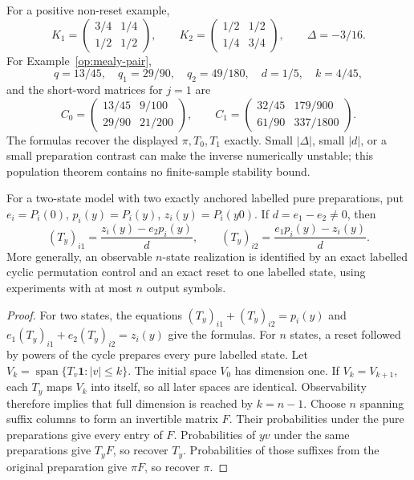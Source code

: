 For a positive non-reset example,
\[
 K_1=\begin{pmatrix}3/4&1/4\\1/2&1/2\end{pmatrix},\qquad
 K_2=\begin{pmatrix}1/2&1/2\\1/4&3/4\end{pmatrix},\qquad
 \Delta=-3/16.
\]
For Example~\ref{op:mealy-pair},
\[
 q=13/45,\quad q_1=29/90,\quad q_2=49/180,\quad
 d=1/5,\quad k=4/45,
\]
and the short-word matrices for \(j=1\) are
\[
 C_0=\begin{pmatrix}13/45&9/100\\29/90&21/200\end{pmatrix},
 \qquad
 C_1=\begin{pmatrix}32/45&179/900\\61/90&337/1800\end{pmatrix}.
\]
The formulas recover the displayed \(\pi,T_0,T_1\) exactly.
Small \(|\Delta|\), small \(|d|\), or a small preparation contrast can
make the inverse numerically unstable; this population theorem
contains no finite-sample stability bound.

\begin{proposition}
\label{op:anchored-preparations}
For a two-state model with two exactly anchored labelled pure
preparations, put
\(e_i=P_i(0)\), \(p_i(y)=P_i(y)\), \(z_i(y)=P_i(y0)\).
If \(d=e_1-e_2\ne0\), then
\[
 (T_y)_{i1}=\frac{z_i(y)-e_2p_i(y)}d,\qquad
 (T_y)_{i2}=\frac{e_1p_i(y)-z_i(y)}d.
\]
More generally, an observable \(n\)-state realization is identified by
an exact labelled cyclic permutation control and an exact reset to
one labelled state, using experiments with at most \(n\) output symbols.
\end{proposition}
\begin{proof}
For two states, the equations
\((T_y)_{i1}+(T_y)_{i2}=p_i(y)\) and
\(e_1(T_y)_{i1}+e_2(T_y)_{i2}=z_i(y)\)
give the formulas.
For \(n\) states, a reset followed by powers of the cycle prepares
every pure labelled state.  Let
\(V_k=\operatorname{span}\{T_v\mathbf1:|v|\le k\}\).
The initial space \(V_0\) has dimension one.
If \(V_k=V_{k+1}\), each \(T_y\) maps \(V_k\) into itself, so all later
spaces are identical.  Observability therefore implies that full
dimension is reached by \(k=n-1\).
Choose \(n\) spanning suffix columns to form an invertible matrix \(F\).
Their probabilities under the pure preparations give every entry of
\(F\).  Probabilities of \(yv\) under the same preparations give
\(T_yF\), so recover \(T_y\).  Probabilities of those suffixes from the
original preparation give \(\pi F\), so recover \(\pi\).
\end{proof}

